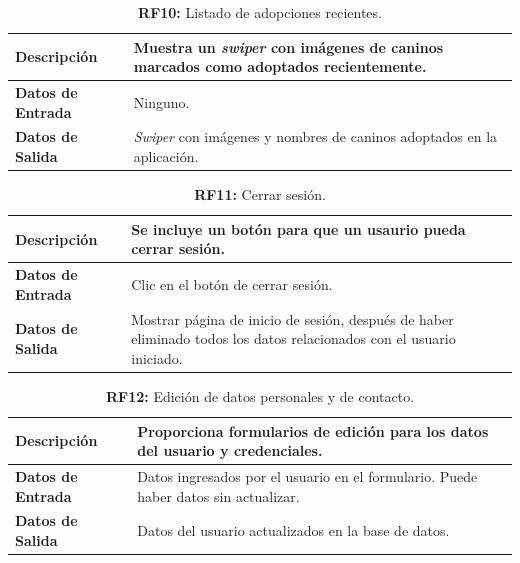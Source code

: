 \documentclass[a4paper, 12pt]{article}
\begin{document}
\begin{table}[H]
\captionsetup{list=no}%
\captionsetup{justification=raggedright,singlelinecheck=false}
\captionsetup{labelformat=empty}
\caption*{\textbf{RF10:} Listado de adopciones recientes.}
\label{tab:RF10}
	\begin{tabular}{|m{5cm}|m{10cm}|}
	\hline
	\textbf{Descripción} & Muestra un \textit{swiper} con imágenes de caninos marcados como adoptados recientemente. \\ 
	\hline
	\textbf{Datos de Entrada} & Ninguno. \\ 
	\hline
	\textbf{Datos de Salida} & \textit{Swiper} con imágenes y nombres de caninos adoptados en la aplicación. \\ 
	\hline
\end{tabular}
\end{table}

\begin{table}[H]
\captionsetup{list=no}%
\captionsetup{justification=raggedright,singlelinecheck=false}
\captionsetup{labelformat=empty}
\caption*{\textbf{RF11:} Cerrar sesión.}
\label{tab:RF11}
	\begin{tabular}{|m{5cm}|m{10cm}|}
	\hline
	\textbf{Descripción} & Se incluye un botón para que un usaurio pueda cerrar sesión. \\ 
	\hline
	\textbf{Datos de Entrada} & Clic en el botón de cerrar sesión. \\ 
	\hline
	\textbf{Datos de Salida} & Mostrar página de inicio de sesión, después de haber eliminado todos los datos relacionados con el usuario iniciado. \\ 
	\hline
\end{tabular}
\end{table}


\begin{table}[H]
\captionsetup{list=no}%
\captionsetup{justification=raggedright,singlelinecheck=false}
\captionsetup{labelformat=empty}
\caption*{\textbf{RF12:} Edición de datos personales y de contacto.}
\label{tab:RF12}
	\begin{tabular}{|m{5cm}|m{10cm}|}
	\hline
	\textbf{Descripción} & Proporciona formularios de edición para los datos del usuario y credenciales. \\ 
	\hline
	\textbf{Datos de Entrada} & Datos ingresados por el usuario en el formulario. Puede haber datos sin actualizar. \\ 
	\hline
	\textbf{Datos de Salida} &  Datos del usuario actualizados en la base de datos. \\ 
	\hline
\end{tabular}
\end{table}
\end{document}
